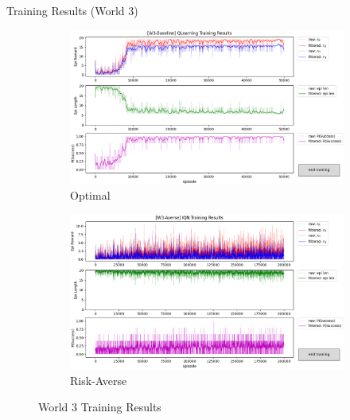 \documentclass[aspectratio=1610, xcolor=dvipsnames]{packages/beamer}
\begin{document}
\newcommand{\Wfig}{0.48}
\begin{frame}{Training Results (World 3)}
     \begin{figure}
     \centering
          \begin{subfigure}[b]{\Wfig\textwidth}  \centering
              \includegraphics[width=\textwidth]{../results/IDQN_W3/Fig_W3_JointQ_Baseline}
              \caption{Optimal} \label{fig:W3baseline0}
          \end{subfigure}
          \hfill
         \begin{subfigure}[b]{\Wfig\textwidth} \centering
             \includegraphics[width=\textwidth]{../results/IDQN_W3/Fig_W3_JointQ_Averse}
             \caption{Risk-Averse} \label{fig:W3averse0}
         \end{subfigure}
    \caption{World 3 Training Results}
    \label{fig:W30}
    \end{figure}
\end{frame}
\end{document}
